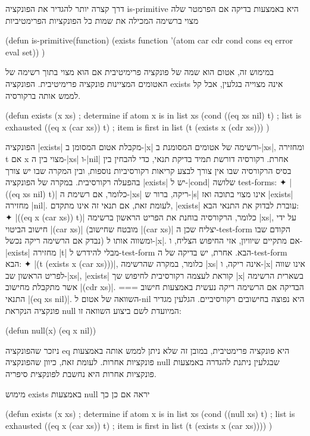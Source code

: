 \documentclass[a4paper,12pt,reqno]{article}
\begin{document}
דרך קצרה יותר להגדיר את הפונקציה is-primitive היא באמצעות בדיקה אם הפרמטר
שלה מצוי ברשימה המכילה את שמות כל הפונקציות הפרימטיביות
\begin{LISP}
(defun is-primitive(function)
  (exists function '(atom car cdr cond cons eq error eval set))
)
\end{LISP}
במימוש זה, אטום הוא שמה של פונקציה פרימיטיבית אם הוא מצוי בתוך רשימה של האטומים
המציינות פונקציה פרימיטיבית. הפונקציה exists אינה מצוייה בגלעין, אבל קל לממש
אותה ברקורסיה.
\begin{LISP}
(defun exists (x xs) ; determine if atom x is in list xs
  (cond
    ((eq xs nil) t) ; list is exhausted
    ((eq x (car xs)) t) ; item is first in list
    (t (exists x (cdr xs)))
)
\end{LISP}
הפונקציה \T|exists| מקבלת אטום המסומן ב-\T|x| ורשימה של אטומים המסומנת
ב-\T|xs|, ומחזירה t אם x מצוי בין ה-\T|xs| ו-\T|nil| אחרת. רקורסיה דורשת תמיד
בדיקת תנאי, כדי להבחין בין בסיס הרקורסיה שבו אין צורך לבצע קריאות רקורסיביות
נוספות, ובין המקרה שבו יש צורך בהפעלה רקורסיבית. במקרה של הפונקציה \T|exists|
יש ל-\T|cond| שלושה test-forms:
✦ \T|((eq xs nil) t)| כלומר, אם רשימת ה-\T|xs| ריקה, ברור ש-\T|s| אינו מצוי
בתוכה ואז \T|exists| מחזירה \T|nil|. לעומת זאת, אם תנאי זה אינו מתקדם,
\T|exists| עוברת לבדוק את התנאי הבא:
✦ \T|((eq x (car xs)) t)| כלומר, הרקורסיה בוחנת את הפריט הראשון ברשימה \T|xs|,
על ידי חישוב הביטוי \T|(car xs)| (מובטח שחישוב \T|(car xs)| יצליח שכן
ה-test-form הקודם שבו נבדק אם הרשימה ריקה נכשל) ומשווה אותו ל-\T|x|. אם מתקיים
שיוויון, אזי החיפוש הצליח, ו-\T|exists| מחזירה \T|t| מבלי להידרש ל-test-form
הבא. אחרת, יש בדיקה של ה-test-form הבא:
✦ \T|(t (exists x (car xs)))|, כלומר, במקרה שהרשימה \T|xs| אינה ריקה, ו-\T|x|
אינו שווה לפריט הראשון שב-\T|xs|, \T|exists| קוראת לעצמה רקורסיבית לחיפוש שך
\T|x| בשארית הרשימה אשר מתקבלת מחישוב \T|(cdr xs)|.
===
הבדיקה אם הרשימה ריקה נעשית באמצעות חישוב התנאי \T|(eq xs nil)|. השוואה של
אטום ל-nil היא נפוצה בחישובים רקורסיביים. הגלעין מגדיר פונקציה הנקראת null
המיועדת לשם ביצוע השוואה זו: 
\begin{LISP}
(defun null(x) (eq x nil))
\end{LISP}
ניזכר שהפונקציה eq היא פונקציה פרימטיבית, במובן זה שלא ניתן לממש אותה באמצעות
פונקציות אחרות. לעומת זאת, כיוון שהפונקציה null שבגלעין ניתנת להגדרה באמצעות
פונקציות אחרות היא נחשבת לפונקצית סיפריה.

מימוש exists באמצעות null יראה אם כן כך
\begin{LISP}
(defun exists (x xs) ; determine if atom x is in list xs
  (cond
    ((null xs) t) ; list is exhausted
    ((eq x (car xs)) t) ; item is first in list
    (t (exists x (car xs))))
)
\end{LISP}
\end{document}
